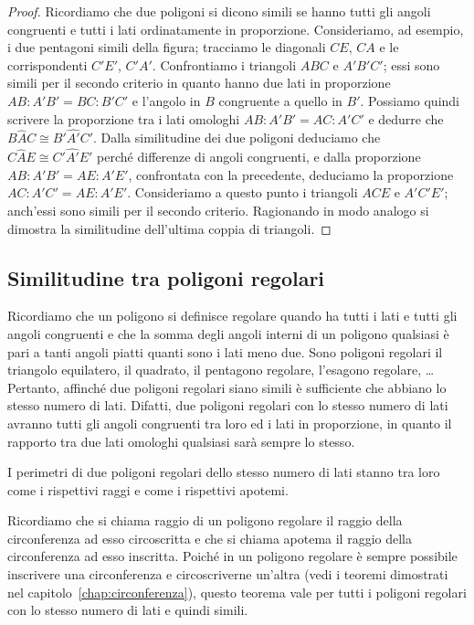 \begin{proof}
Ricordiamo che due poligoni si dicono simili se hanno tutti gli angoli congruenti e tutti i lati ordinatamente in proporzione. Consideriamo, ad esempio, i due pentagoni simili della figura; tracciamo le diagonali $CE$, $CA$ e le corrispondenti $C'E'$, $C'A'$. Confrontiamo i triangoli $ABC$ e $A'B'C'$; essi sono simili per il secondo criterio in quanto hanno due lati in proporzione $AB : A'B' = BC : B'C'$ e l'angolo in $B$ congruente a quello in $B'$. Possiamo quindi scrivere la proporzione tra i lati omologhi $AB : A'B' = AC : A'C'$ e dedurre che $B\widehat{A}C\cong B'\widehat{A'}C'$. Dalla similitudine dei due poligoni deduciamo che $C\widehat{A}E\cong C'\widehat{A'}E'$ perché differenze di angoli congruenti, e dalla proporzione $AB:A'B'=AE:A'E'$, confrontata con la precedente, deduciamo la proporzione $AC:A'C'=AE:A'E'$. Consideriamo a questo punto i triangoli $ACE$ e $A'C'E'$; anch'essi sono simili per il secondo criterio. Ragionando in modo analogo si dimostra la similitudine dell'ultima coppia di triangoli.
\end{proof}

\subsection{Similitudine tra poligoni regolari}

Ricordiamo che un poligono si definisce regolare quando ha tutti i lati e tutti gli angoli congruenti e che la somma degli angoli interni di un poligono qualsiasi è pari a tanti angoli piatti quanti sono i lati meno due. Sono poligoni regolari il triangolo equilatero, il quadrato, il pentagono regolare, l'esagono regolare, \ldots{} Pertanto, affinché due poligoni regolari siano simili è sufficiente che abbiano lo stesso numero di lati. Difatti, due poligoni regolari con lo stesso numero di lati avranno tutti gli angoli congruenti tra loro ed i lati in proporzione, in quanto il rapporto tra due lati omologhi qualsiasi sarà sempre lo stesso.

\begin{teorema}
I perimetri di due poligoni regolari dello stesso numero di lati stanno tra loro come i rispettivi raggi e come i rispettivi apotemi.
\end{teorema}

Ricordiamo che si chiama raggio di un poligono regolare il raggio della circonferenza ad esso circoscritta e che si chiama apotema il raggio della circonferenza ad esso inscritta. Poiché in un poligono regolare è sempre possibile inscrivere una circonferenza e circoscriverne un'altra (vedi i teoremi dimostrati nel capitolo~\ref{chap:circonferenza}), questo teorema vale per tutti i poligoni regolari con lo stesso numero di lati e quindi simili.

